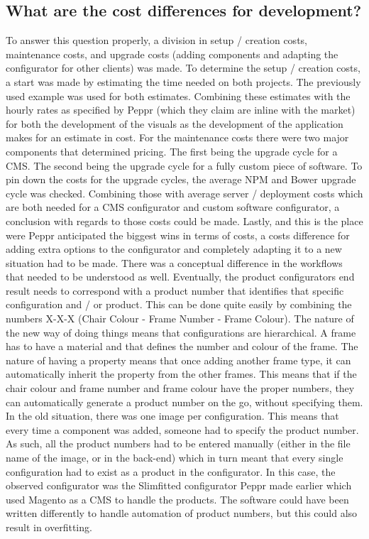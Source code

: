 \subsection{What are the cost differences for development?}
To answer this question properly, a division in setup / creation costs, maintenance costs, and upgrade costs (adding components and adapting the configurator for other clients) was made. To determine the setup / creation costs, a start was made by estimating the time needed on both projects. The previously used example was used for both estimates. Combining these estimates with the hourly rates as specified by Peppr (which they claim are inline with the market) for both the development of the visuals as the development of the application makes for an estimate in cost.\newline
For the maintenance costs there were two major components that determined pricing. The first being the upgrade cycle for a CMS. The second being the upgrade cycle for a fully custom piece of software. To pin down the costs for the upgrade cycles, the average NPM and Bower upgrade cycle was checked. Combining those with average server / deployment costs which are both needed for a CMS configurator and custom software configurator, a conclusion with regards to those costs could be made.\newline
Lastly, and this is the place were Peppr anticipated the biggest wins in terms of costs, a costs difference for adding extra options to the configurator and completely adapting it to a new situation had to be made. There was a conceptual difference in the workflows that needed to be understood as well. Eventually, the product configurators end result needs to correspond with a product number that identifies that specific configuration and / or product. This can be done quite easily by combining the numbers X-X-X (Chair Colour - Frame Number - Frame Colour). The nature of the new way of doing things means that configurations are hierarchical. A frame has to have a material and that defines the number and colour of the frame. The nature of having a property means that once adding another frame type, it can automatically inherit the property from the other frames. This means that if the chair colour and frame number and frame colour have the proper numbers, they can automatically generate a product number on the go, without specifying them.\newline
In the old situation, there was one image per configuration. This means that every time a component was added, someone had to specify the product number. As such, all the product numbers had to be entered manually (either in the file name of the image, or in the back-end) which in turn meant that every single configuration had to exist as a product in the configurator. In this case, the observed configurator was the Slimfitted configurator Peppr made earlier which used Magento as a CMS to handle the products. The software could have been written differently to handle automation of product numbers, but this could also result in overfitting.\newline
